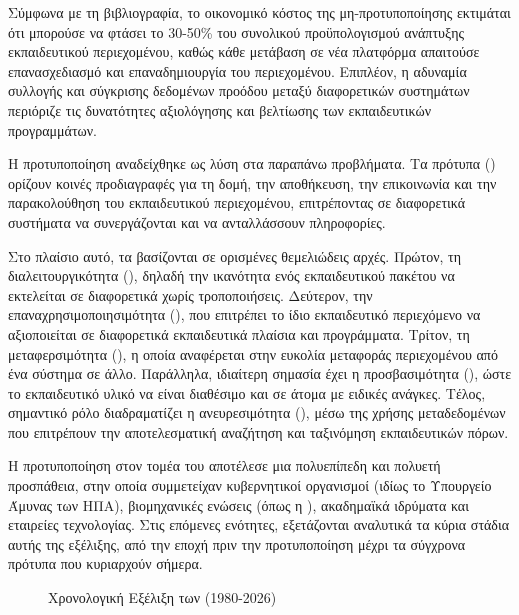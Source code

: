 Σύμφωνα με τη βιβλιογραφία, το οικονομικό κόστος της μη-προτυποποίησης εκτιμάται ότι μπορούσε να φτάσει το 30-50\% του συνολικού προϋπολογισμού
ανάπτυξης εκπαιδευτικού περιεχομένου, καθώς κάθε μετάβαση σε νέα πλατφόρμα απαιτούσε επανασχεδιασμό και επαναδημιουργία του περιεχομένου.
Επιπλέον, η αδυναμία συλλογής και σύγκρισης δεδομένων προόδου μεταξύ διαφορετικών συστημάτων περιόριζε τις δυνατότητες αξιολόγησης και βελτίωσης
των εκπαιδευτικών προγραμμάτων.

Η προτυποποίηση αναδείχθηκε ως λύση στα παραπάνω προβλήματα. Τα πρότυπα (\textit{}) ορίζουν κοινές προδιαγραφές για τη δομή,
την αποθήκευση, την επικοινωνία και την παρακολούθηση του εκπαιδευτικού περιεχομένου, επιτρέποντας σε διαφορετικά συστήματα να συνεργάζονται
και να ανταλλάσσουν πληροφορίες.

Στο πλαίσιο αυτό, τα   βασίζονται σε ορισμένες θεμελιώδεις αρχές.
Πρώτον, τη διαλειτουργικότητα (), δηλαδή την ικανότητα ενός εκπαιδευτικού πακέτου να εκτελείται σε διαφορετικά
 χωρίς τροποποιήσεις. Δεύτερον, την επαναχρησιμοποιησιμότητα (), που επιτρέπει 
το ίδιο εκπαιδευτικό περιεχόμενο να αξιοποιείται σε διαφορετικά εκπαιδευτικά πλαίσια και προγράμματα. 
Τρίτον, τη μεταφερσιμότητα (), η οποία αναφέρεται στην ευκολία μεταφοράς περιεχομένου από ένα σύστημα σε άλλο.
Παράλληλα, ιδιαίτερη σημασία έχει η προσβασιμότητα (), ώστε το εκπαιδευτικό υλικό να είναι διαθέσιμο και 
σε άτομα με ειδικές ανάγκες. Τέλος, σημαντικό ρόλο διαδραματίζει η ανευρεσιμότητα (),
μέσω της χρήσης μεταδεδομένων που επιτρέπουν την αποτελεσματική αναζήτηση και ταξινόμηση εκπαιδευτικών πόρων.

Η προτυποποίηση στον τομέα του  αποτέλεσε μια πολυεπίπεδη και πολυετή προσπάθεια, στην οποία συμμετείχαν κυβερνητικοί οργανισμοί (ιδίως το Υπουργείο Άμυνας των ΗΠΑ), βιομηχανικές ενώσεις (όπως η     ), ακαδημαϊκά ιδρύματα και εταιρείες τεχνολογίας. Στις επόμενες ενότητες, εξετάζονται αναλυτικά τα κύρια στάδια αυτής της εξέλιξης, από την εποχή πριν την προτυποποίηση μέχρι τα σύγχρονα πρότυπα που κυριαρχούν σήμερα.

\begin{figure}[H]
  \centering
  
  \caption{Χρονολογική Εξέλιξη των   (1980-2026)}
  \label{fig:timeline_evolution}
\end{figure}

